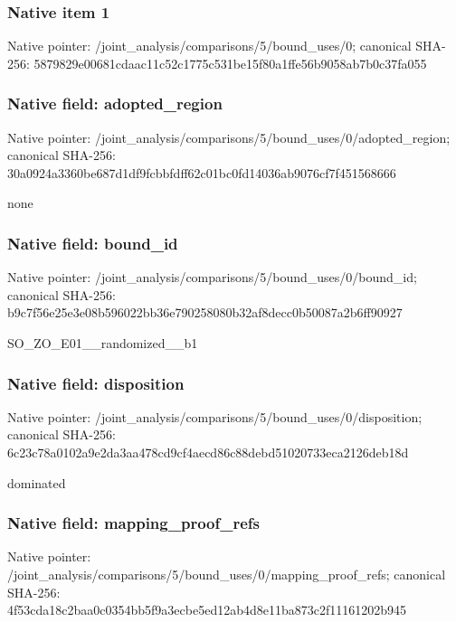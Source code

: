 \documentclass[10pt,a4paper]{article}
\begin{document}
\subsubsection{Native item 1}
Native pointer: /joint\_\allowbreak{}analysis/comparisons/5/bound\_\allowbreak{}uses/0; canonical SHA-256: 5879829e00681cdaac11c52c1775c531be15f80a1ffe56b9058ab7b0c37fa055

\subsubsection{Native field: adopted\_\allowbreak{}region}
Native pointer: /joint\_\allowbreak{}analysis/comparisons/5/bound\_\allowbreak{}uses/0/adopted\_\allowbreak{}region; canonical SHA-256: 30a0924a3360be687d1df9fcbbfdff62c01bc0fd14036ab9076cf7f451568666

\begingroup\raggedright\sloppy none\par\endgroup

\subsubsection{Native field: bound\_\allowbreak{}id}
Native pointer: /joint\_\allowbreak{}analysis/comparisons/5/bound\_\allowbreak{}uses/0/bound\_\allowbreak{}id; canonical SHA-256: b9c7f56e25e3e08b596022bb36e790258080b32af8decc0b50087a2b6ff90927

\begingroup\raggedright\sloppy SO\_\allowbreak{}ZO\_\allowbreak{}E01\_\allowbreak{}\_\allowbreak{}randomized\_\allowbreak{}\_\allowbreak{}b1\par\endgroup

\subsubsection{Native field: disposition}
Native pointer: /joint\_\allowbreak{}analysis/comparisons/5/bound\_\allowbreak{}uses/0/disposition; canonical SHA-256: 6c23c78a0102a9e2da3aa478cd9cf4aecd86c88debd51020733eca2126deb18d

\begingroup\raggedright\sloppy dominated\par\endgroup

\subsubsection{Native field: mapping\_\allowbreak{}proof\_\allowbreak{}refs}
Native pointer: /joint\_\allowbreak{}analysis/comparisons/5/bound\_\allowbreak{}uses/0/mapping\_\allowbreak{}proof\_\allowbreak{}refs; canonical SHA-256: 4f53cda18c2baa0c0354bb5f9a3ecbe5ed12ab4d8e11ba873c2f11161202b945
\end{document}
